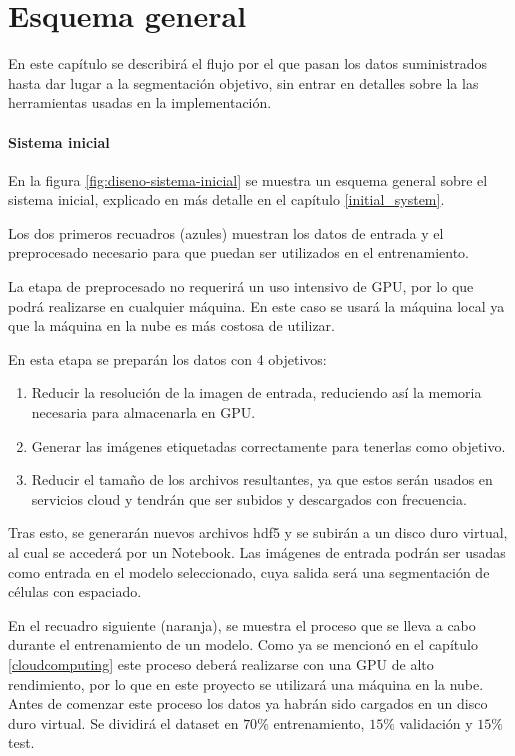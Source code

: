 \chapter{Esquema general}\label{requisitos}

En este capítulo se describirá el flujo por el que pasan los datos suministrados hasta dar lugar a la segmentación objetivo, sin entrar en detalles sobre la las herramientas usadas en la implementación.

\subsubsection{Sistema inicial}


En la figura \ref{fig:diseno-sistema-inicial} se muestra un esquema general sobre el sistema inicial, explicado en más detalle en el capítulo \ref{initial_system}. 

Los dos primeros recuadros (azules) muestran los datos de entrada y el preprocesado necesario para que puedan ser utilizados en el entrenamiento.

La etapa de preprocesado no requerirá un uso intensivo de GPU, por lo que podrá realizarse en cualquier máquina. En este caso se usará la máquina local ya que la máquina en la nube es más costosa de utilizar.

En esta etapa se preparán los datos con 4 objetivos:
\begin{enumerate}
\item Reducir la resolución de la imagen de entrada, reduciendo así la memoria necesaria para almacenarla en GPU.
\item Generar las imágenes etiquetadas correctamente para tenerlas como objetivo.
\item Reducir el tamaño de los archivos resultantes, ya que estos serán usados en servicios cloud y tendrán que ser subidos y descargados con frecuencia.
\end{enumerate}

Tras esto, se generarán nuevos archivos hdf5 y se subirán a un disco duro virtual, al cual se accederá por un Notebook. Las imágenes de entrada podrán ser usadas como entrada en el modelo seleccionado, cuya salida será una segmentación de células con espaciado.

En el recuadro siguiente (naranja), se muestra el proceso que se lleva a cabo durante el entrenamiento de un modelo. Como ya se mencionó en el capítulo \ref{cloudcomputing} este proceso deberá realizarse con una GPU de alto rendimiento, por lo que en este proyecto se utilizará una máquina en la nube. Antes de comenzar este proceso los datos ya habrán sido cargados en un disco duro virtual. Se dividirá el dataset en $ 70\% $ entrenamiento, $ 15\% $ validación y $ 15\% $ test.


